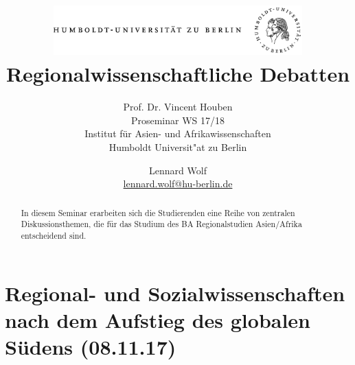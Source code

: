 \documentclass[emulatestandardclasses]{scrartcl}
\date{\vspace{-3ex}}
\begin{document}
\title{
	\includegraphics*[bb=0 0 720 200, width=0.72\textwidth]{ErstesSem/images/hu_logo.png}\\
	\vspace{25pt}
	Regionalwissenschaftliche Debatten}
\subtitle{\vspace{10pt}
			Prof. Dr. Vincent Houben\\
			Proseminar WS 17/18\\
          Institut für Asien- und Afrikawissenschaften\\ 
          Humboldt Universit"at zu Berlin}
\author{Lennard Wolf\\
        \small{\href{mailto:lennard.wolf@hu-berlin.de}{lennard.wolf@hu-berlin.de}}}
\maketitle
\begin{abstract}
In diesem Seminar erarbeiten sich die Studierenden eine Reihe von zentralen Diskussionsthemen, die für das Studium des BA Regionalstudien Asien/Afrika entscheidend sind.

\end{abstract}
\newpage

\newpage



\section{Regional- und Sozialwissenschaften nach dem Aufstieg des globalen Südens (08.11.17)}
\end{document}
